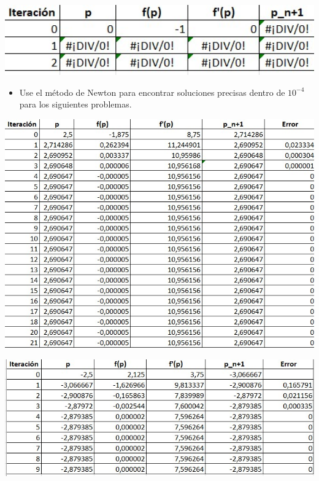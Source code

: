 \documentclass[12pt]{article}
\begin{document}
\begin{minipage}{0.95\textwidth}
    \raggedleft
    \includegraphics[width=1.15\textwidth]{inFiles/Figures/ejer3.jpg}
\end{minipage}
\vspace{0.5cm}

\begin{itemize}
    \item { Use el método de Newton para encontrar soluciones precisas dentro de $10^{-4}$ para los siguientes problemas.}
\end{itemize}
\begin{minipage}{0.95\textwidth}
    \raggedleft
    \includegraphics[width=1.15\textwidth]{inFiles/Figures/ejer4.jpg}
\end{minipage}
\vspace{1.5cm}

\begin{minipage}{0.95\textwidth}
    \raggedleft
    \includegraphics[width=1.15\textwidth]{inFiles/Figures/ejer5.jpg}
\end{minipage}
\vspace{3.5cm}
\end{document}
